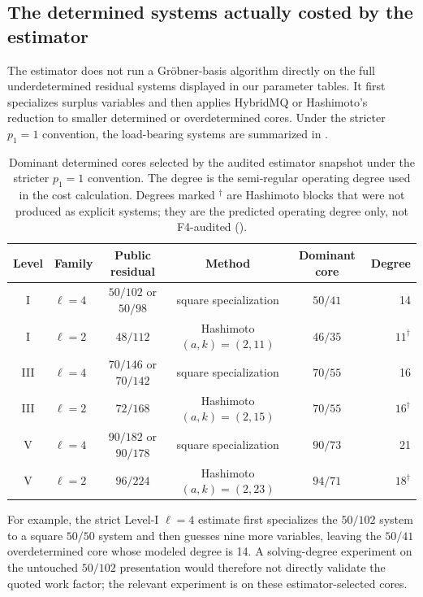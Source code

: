 \documentclass[11pt]{article}
\begin{document}
\subsection{The determined systems actually costed by the estimator}
\label{sec:actual-cores}

The estimator does not run a Gr\"obner-basis algorithm directly on the full
underdetermined residual systems displayed in our parameter tables.  It first
specializes surplus variables and then applies HybridMQ or Hashimoto's
reduction to smaller determined or overdetermined cores.  Under the stricter
$p_1=1$ convention, the load-bearing systems are summarized in
.

\begin{table}[t]
\centering
\caption{Dominant determined cores selected by the audited estimator snapshot under the
stricter $p_1=1$ convention.  The degree is the semi-regular operating degree
used in the cost calculation.  Degrees marked $^\dagger$ are Hashimoto blocks
that were not produced as explicit systems; they are the predicted operating
degree only, not F4-audited ().}
\label{tab:actual-cores}
\small
\setlength{\tabcolsep}{4pt}
\begin{tabular}{@{}c l c c c r@{}}
\toprule
Level & Family & Public residual & Method & Dominant core & Degree\\
\midrule
I   & $\ell=4$ & $50/102$ or $50/98$ & square specialization & $50/41$ & 14\\
I   & $\ell=2$ & $48/112$ & Hashimoto $(a,k)=(2,11)$ & $46/35$ & $11^\dagger$\\
III & $\ell=4$ & $70/146$ or $70/142$ & square specialization & $70/55$ & 16\\
III & $\ell=2$ & $72/168$ & Hashimoto $(a,k)=(2,15)$ & $70/55$ & $16^\dagger$\\
V   & $\ell=4$ & $90/182$ or $90/178$ & square specialization & $90/73$ & 21\\
V   & $\ell=2$ & $96/224$ & Hashimoto $(a,k)=(2,23)$ & $94/71$ & $18^\dagger$\\
\bottomrule
\end{tabular}
\end{table}

For example, the strict Level-I $\ell=4$ estimate first specializes the $50/102$
system to a square $50/50$ system and then guesses nine more variables, leaving
the $50/41$ overdetermined core whose modeled degree is 14.  A solving-degree
experiment on the untouched $50/102$ presentation would therefore not directly
validate the quoted work factor; the relevant experiment is on these
estimator-selected cores.
\end{document}
